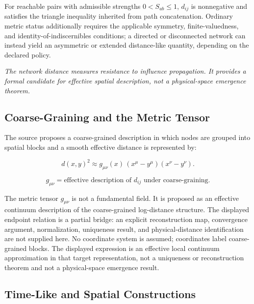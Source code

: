 \begin{proposition}
For reachable pairs with admissible strengths $0<S_{ab}\leq1$, $d_{ij}$ is
nonnegative and satisfies the triangle inequality inherited from path
concatenation. Ordinary metric status additionally requires the applicable
symmetry, finite-valuedness, and identity-of-indiscernibles conditions; a
directed or disconnected network can instead yield an asymmetric or extended
distance-like quantity, depending on the declared policy.
\end{proposition}

\begin{keybox}
\textit{The network distance measures resistance to influence propagation.
It provides a formal candidate for effective spatial description, not a
physical-space emergence theorem.}
\end{keybox}

\subsection{Coarse-Graining and the Metric Tensor}

The source proposes a coarse-grained description in which nodes are grouped
into spatial blocks and a smooth effective distance is represented by:

\[
  d(x, y)^2 \approx g_{\mu\nu}(x)\,(x^\mu - y^\mu)(x^\nu - y^\nu).
\]

\begin{keybox}
\begin{equation}
  g_{\mu\nu} = \text{effective description of } d_{ij}
  \text{ under coarse-graining.}
  \label{eq:metric}
\end{equation}
\end{keybox}

\noindent
The metric tensor $g_{\mu\nu}$ is not a fundamental field.
It is proposed as an effective continuum description of the coarse-grained
log-distance structure. The displayed endpoint relation is a partial bridge:
an explicit reconstruction map, convergence argument, normalization,
uniqueness result, and physical-distance identification are not supplied here.
No coordinate system is assumed; coordinates label coarse-grained blocks.
The displayed expression is an effective local continuum approximation in
that target representation, not a uniqueness or reconstruction theorem and
not a physical-space emergence result.

\subsection{Time-Like and Spatial Constructions}

